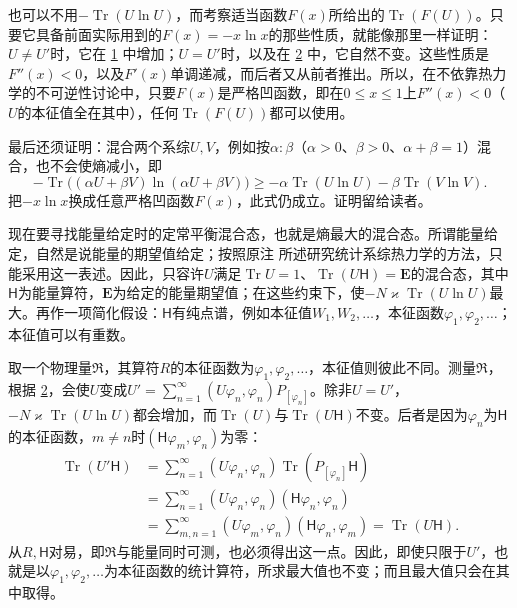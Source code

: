 \documentclass[fontsize=13pt,twoside,openany,headings=normal,parskip=false,bookmarkpackage=false,DIV=calc]{scrbook}
\begin{document}
也可以不用$-\operatorname{Tr}(U\ln U)$，而考察适当函数$F(x)$所给出的$\operatorname{Tr}(F(U))$。只要它具备前面实际用到的$F(x)=-x\ln x$的那些性质，就能像那里一样证明：$U\ne U'$时，它在 \hyperref[eq:V.1.1]{1} 中增加；$U=U'$时，以及在 \hyperref[eq:V.1.2]{2} 中，它自然不变。这些性质是$F''(x)<0$，以及$F'(x)$单调递减，而后者又从前者推出。所以，在不依靠热力学的不可逆性讨论中，只要$F(x)$是严格凹函数，即在$0\leq x\leq1$上$F''(x)<0$（$U$的本征值全在其中），任何$\operatorname{Tr}(F(U))$都可以使用。

最后还须证明：混合两个系综$U,\allowbreak V$，例如按$\alpha:\beta$（$\alpha>0$、$\beta>0$、$\alpha+\beta=1$）混合，也不会使熵减小，即
\[
-\operatorname{Tr}\bigl((\alpha U+\beta V)\ln(\alpha U+\beta V)\bigr)
\geq-\alpha\operatorname{Tr}(U\ln U)-\beta\operatorname{Tr}(V\ln V).
\]
把$-x\ln x$换成任意严格凹函数$F(x)$，此式仍成立。证明留给读者。

现在要寻找能量给定时的定常平衡混合态，也就是熵最大的混合态。所谓能量给定，自然是说能量的期望值\hypertarget{origpage-208}{}\label{origpage-208}给定；按照原注 \hyperlink{note-184}{} 所述研究统计系综热力学的方法，只能采用这一表述。因此，只容许$U$满足$\operatorname{Tr}U=1$、$\operatorname{Tr}(U\mathsf{H})=\mathbf E$的混合态，其中$\mathsf{H}$为能量算符，$\mathbf E$为给定的能量期望值；在这些约束下，使$-N\varkappa\operatorname{Tr}(U\ln U)$最大。再作一项简化假设：$\mathsf{H}$有纯点谱，例如本征值$W_1,\allowbreak W_2,\allowbreak \ldots$，本征函数$\varphi_1,\allowbreak \varphi_2,\allowbreak \ldots$；本征值可以有重数。

取一个物理量$\mathfrak R$，其算符$R$的本征函数为$\varphi_1,\allowbreak \varphi_2,\allowbreak \ldots$，本征值则彼此不同。测量$\mathfrak R$，根据 \hyperref[eq:V.1.2]{2}，会使$U$变成$U'=\sum_{n=1}^{\infty}(U\varphi_n,\allowbreak \varphi_n)P_{[\varphi_n]}$。除非$U=U'$，$-N\varkappa\operatorname{Tr}(U\ln U)$都会增加，而$\operatorname{Tr}(U)$与$\operatorname{Tr}(U\mathsf{H})$不变。后者是因为$\varphi_n$为$\mathsf{H}$的本征函数，$m\ne n$时$(\mathsf{H}\varphi_m,\allowbreak \varphi_n)$为零：
\begin{align*}
\operatorname{Tr}(U'\mathsf{H})
&=\sum_{n=1}^{\infty}(U\varphi_n,\varphi_n)\operatorname{Tr}(P_{[\varphi_n]}\mathsf{H})\\
&=\sum_{n=1}^{\infty}(U\varphi_n,\varphi_n)(\mathsf{H}\varphi_n,\varphi_n)\\
&=\sum_{m,n=1}^{\infty}(U\varphi_m,\varphi_n)(\mathsf{H}\varphi_n,\varphi_m)
=\operatorname{Tr}(U\mathsf{H}).
\end{align*}
从$R,\allowbreak \mathsf{H}$对易，即$\mathfrak R$与能量同时可测，也必须得出这一点。因此，即使只限于$U'$，也就是以$\varphi_1,\allowbreak \varphi_2,\allowbreak \ldots$为本征函数的统计算符，所求最大值也不变；而且最大值只会在其中取得。
\end{document}
